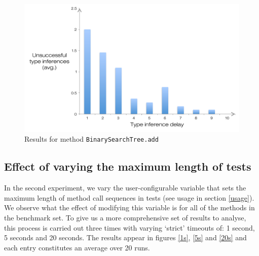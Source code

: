 \begin{figure}[h]
\hspace*{-0.5cm}
\centering
\includegraphics[scale=0.55]{./components/chapter7/bst.pdf}
\caption{Results for method \texttt{BinarySearchTree.add}}
\label{bstbench}
\end{figure}

\subsection{Effect of varying the maximum length of tests}
\label{exp2}
In the second experiment, we vary the user-configurable variable that sets the maximum length of method call sequences in tests (see usage in section \ref{usage}). We observe what the effect of modifying this variable is for all of the methods in the benchmark set. To give us a more comprehensive set of results to analyse, this process is carried out three times with varying `strict' timeouts of: 1 second, 5 seconds and 20 seconds. The results appear in figures \ref{1s}, \ref{5s} and \ref{20s} and each entry constitutes an average over 20 runs.

